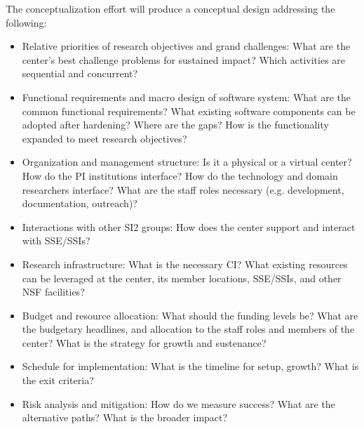 The conceptualization effort will produce a conceptual design addressing the following:
\begin{itemize}
\item Relative priorities of research objectives and grand challenges: What are the center’s best
challenge problems for sustained impact? Which activities are sequential and concurrent?
\item Functional requirements and macro design of software system: What are the common
functional requirements? What existing software components can be adopted after hardening?
Where are the gaps? How is the functionality expanded to meet research objectives?
\item Organization and management structure: Is it a physical or a virtual center? How do the PI
institutions interface? How do the technology and domain researchers interface? What are
the staff roles necessary (e.g. development, documentation, outreach)?
\item Interactions with other SI2 groups: How does the center support and interact with SSE/SSIs?
\item Research infrastructure: What is the necessary CI? What existing resources can be leveraged
at the center, its member locations, SSE/SSIs, and other NSF facilities?
\item Budget and resource allocation: What should the funding levels be? What are the budgetary
headlines, and allocation to the staff roles and members of the center? What is the strategy
for growth and sustenance?
\item Schedule for implementation: What is the timeline for setup, growth? What is the exit criteria?
\item Risk analysis and mitigation: How do we measure success? What are the alternative paths?
What is the broader impact?
\end{itemize}
